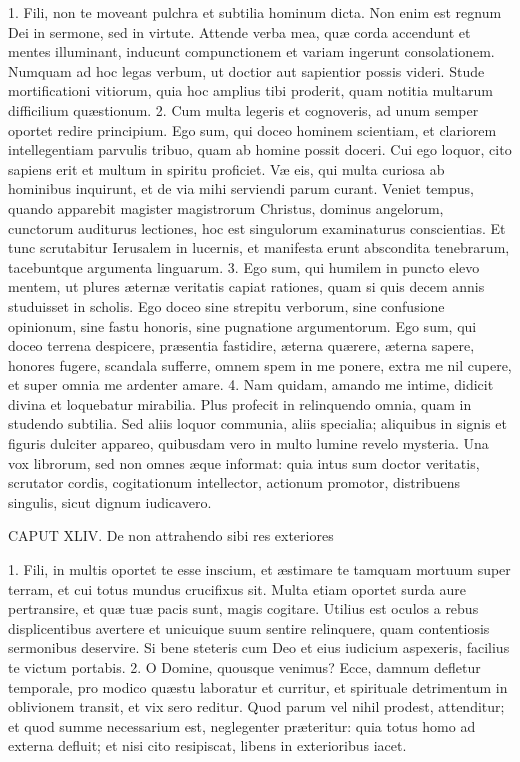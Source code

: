 \documentclass[twoside]{article}
\begin{document}
1. Fili, non te moveant pulchra et subtilia hominum dicta. Non enim est regnum Dei in sermone, sed in virtute. Attende verba mea, quæ corda accendunt et mentes illuminant, inducunt compunctionem et variam ingerunt consolationem. Numquam ad hoc legas verbum, ut doctior aut sapientior possis videri. Stude mortificationi vitiorum, quia hoc amplius tibi proderit, quam notitia multarum difficilium quæstionum.
2. Cum multa legeris et cognoveris, ad unum semper oportet redire principium. Ego sum, qui doceo hominem scientiam, et clariorem intellegentiam parvulis tribuo, quam ab homine possit doceri. Cui ego loquor, cito sapiens erit et multum in spiritu proficiet. Væ eis, qui multa curiosa ab hominibus inquirunt, et de via mihi serviendi parum curant. Veniet tempus, quando apparebit magister magistrorum Christus, dominus angelorum, cunctorum auditurus lectiones, hoc est singulorum examinaturus conscientias. Et tunc scrutabitur Ierusalem in lucernis, et manifesta erunt abscondita tenebrarum, tacebuntque argumenta linguarum.
3. Ego sum, qui humilem in puncto elevo mentem, ut plures æternæ veritatis capiat rationes, quam si quis decem annis studuisset in scholis. Ego doceo sine strepitu verborum, sine confusione opinionum, sine fastu honoris, sine pugnatione argumentorum. Ego sum, qui doceo terrena despicere, præsentia fastidire, æterna quærere, æterna sapere, honores fugere, scandala sufferre, omnem spem in me ponere, extra me nil cupere, et super omnia me ardenter amare.
4. Nam quidam, amando me intime, didicit divina et loquebatur mirabilia. Plus profecit in relinquendo omnia, quam in studendo subtilia. Sed aliis loquor communia, aliis specialia; aliquibus in signis et figuris dulciter appareo, quibusdam vero in multo lumine revelo mysteria. Una vox librorum, sed non omnes æque informat: quia intus sum doctor veritatis, scrutator cordis, cogitationum intellector, actionum promotor, distribuens singulis, sicut dignum iudicavero.


CAPUT XLIV.
De non attrahendo sibi res exteriores

1. Fili, in multis oportet te esse inscium, et æstimare te tamquam mortuum super terram, et cui totus mundus crucifixus sit. Multa etiam oportet surda aure pertransire, et quæ tuæ pacis sunt, magis cogitare. Utilius est oculos a rebus displicentibus avertere et unicuique suum sentire relinquere, quam contentiosis sermonibus deservire. Si bene steteris cum Deo et eius iudicium aspexeris, facilius te victum portabis.
2. O Domine, quousque venimus? Ecce, damnum defletur temporale, pro modico quæstu laboratur et curritur, et spirituale detrimentum in oblivionem transit, et vix sero reditur. Quod parum vel nihil prodest, attenditur; et quod summe necessarium est, neglegenter præteritur: quia totus homo ad externa defluit; et nisi cito resipiscat, libens in exterioribus iacet.
\end{document}
